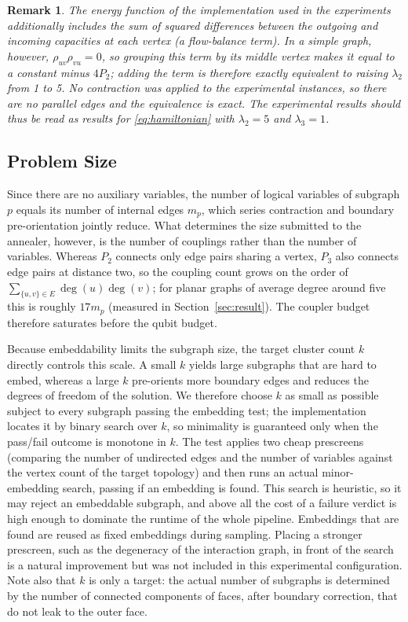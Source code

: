 \documentclass[twocolumn,a4paper]{article}
\newtheorem{remark}{Remark}
\begin{document}
\begin{remark} \label{rmk:flow}
The energy function of the implementation used in the experiments additionally includes the sum of squared differences between the outgoing and incoming capacities at each vertex (a flow-balance term). In a simple graph, however, \(\rho_{uv}\rho_{vu}=0\), so grouping this term by its middle vertex makes it equal to a constant minus \(4P_2\); adding the term is therefore exactly equivalent to raising \(\lambda_2\) from 1 to 5. No contraction was applied to the experimental instances, so there are no parallel edges and the equivalence is exact. The experimental results should thus be read as results for \eqref{eq:hamiltonian} with \(\lambda_2=5\) and \(\lambda_3=1\).
\end{remark}

\subsection{Problem Size} \label{subsec:method_partition}

Since there are no auxiliary variables, the number of logical variables of subgraph \(p\) equals its number of internal edges \(m_p\), which series contraction and boundary pre-orientation jointly reduce. What determines the size submitted to the annealer, however, is the number of couplings rather than the number of variables. Whereas \(P_2\) connects only edge pairs sharing a vertex, \(P_3\) also connects edge pairs at distance two, so the coupling count grows on the order of \(\sum_{\{u,v\}\in E}\deg(u)\deg(v)\); for planar graphs of average degree around five this is roughly \(17m_p\) (measured in Section~\ref{sec:result}). The coupler budget therefore saturates before the qubit budget.

Because embeddability limits the subgraph size, the target cluster count \(k\) directly controls this scale. A small \(k\) yields large subgraphs that are hard to embed, whereas a large \(k\) pre-orients more boundary edges and reduces the degrees of freedom of the solution. We therefore choose \(k\) as small as possible subject to every subgraph passing the embedding test; the implementation locates it by binary search over \(k\), so minimality is guaranteed only when the pass/fail outcome is monotone in \(k\). The test applies two cheap prescreens (comparing the number of undirected edges and the number of variables against the vertex count of the target topology) and then runs an actual minor-embedding search, passing if an embedding is found. This search is heuristic, so it may reject an embeddable subgraph, and above all the cost of a failure verdict is high enough to dominate the runtime of the whole pipeline. Embeddings that are found are reused as fixed embeddings during sampling. Placing a stronger prescreen, such as the degeneracy of the interaction graph, in front of the search is a natural improvement but was not included in this experimental configuration. Note also that \(k\) is only a target: the actual number of subgraphs is determined by the number of connected components of faces, after boundary correction, that do not leak to the outer face.
\end{document}
